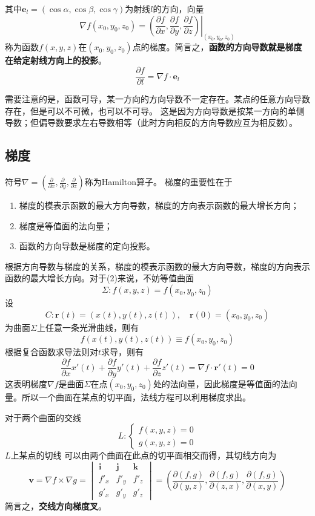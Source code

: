 其中$\bm{e}_l=(\cos\alpha,\cos\beta,\cos\gamma)$为射线$l$的方向，向量
\begin{equation}
    \nabla f(x_0,y_0,z_0)=\left.\left(\frac{\partial f}{\partial x},\frac{\partial f}{\partial y},\frac{\partial f}{\partial z}\right)\right|_{(x_0,y_0,z_0)}
\end{equation}
称为函数$f(x,y,z)$在$(x_0,y_0,z_0)$点的梯度。简言之，\textbf{\textsf{函数的方向导数就是梯度在给定射线方向上的投影}}。
\begin{equation}
    \frac{\partial f}{\partial l} = \nabla f\cdot \bm{e}_l
\end{equation}

需要注意的是，函数可导，某一方向的方向导数不一定存在。某点的任意方向导数存在，但是可以不可微，也可以不可导。
这是因为方向导数是按某一方向的单侧导数；但偏导数要求左右导数相等（此时方向相反的方向导数应互为相反数）。


\subsection{梯度}
符号$\nabla=\left(\frac{\partial}{\partial x},\frac{\partial }{\partial y},\frac{\partial}{\partial z}\right)$称为Hamilton算子。
梯度的重要性在于
\begin{enumerate}[(1)]
    \item 梯度的模表示函数的最大方向导数，梯度的方向表示函数的最大增长方向；
    \item 梯度是等值面的法向量；
    \item 函数的方向导数是梯度的定向投影。
\end{enumerate}

根据方向导数与梯度的关系，梯度的模表示函数的最大方向导数，梯度的方向表示函数的最大增长方向。对于(2)来说，不妨等值曲面
\[ \Sigma : f(x,y,z) = f(x_0,y_0,z_0) \]
设
\[ C: \bm{r}(t) = (x(t),y(t),z(t)),\quad \bm{r}(0) = (x_0,y_0,z_0) \]
为曲面$\Sigma$上任意一条光滑曲线，则有
\[ f(x(t),y(t),z(t)) \equiv f(x_0,y_0,z_0) \]
根据复合函数求导法则对$t$求导，则有
\[
    \frac{\partial f}{\partial x} x'(t) + \frac{\partial f}{\partial y} y'(t) + \frac{\partial f}{\partial z} z'(t)
    = \nabla f\cdot\bm{r}'(t)
    = 0
\]
这表明梯度$\nabla f$是曲面$\Sigma$在点$(x_0,y_0,z_0)$处的法向量，因此梯度是等值面的法向量。所以一个曲面在某点的切平面，法线方程可以利用梯度求出。

对于两个曲面的交线
\[
    L :
    \begin{cases}
        f(x,y,z) = 0 \\
        g(x,y,z) = 0
    \end{cases}
\]
$L$上某点的切线
可以由两个曲面在此点的切平面相交而得，其切线方向为
\[
    \bm{v} = \nabla f \times \nabla g
    =
    \begin{vmatrix}
        \bm{i} & \bm{j} & \bm{k} \\
        f'_x   & f'_y   & f'_z   \\
        g'_x   & g'_y   & g'_z
    \end{vmatrix}
    = \left(\frac{\partial(f,g)}{\partial(y,z)}, \frac{\partial(f,g)}{\partial(z,x)},\frac{\partial(f,g)}{\partial(x,y)}\right)
\]
简言之，\textbf{\textsf{交线方向梯度叉}}。


